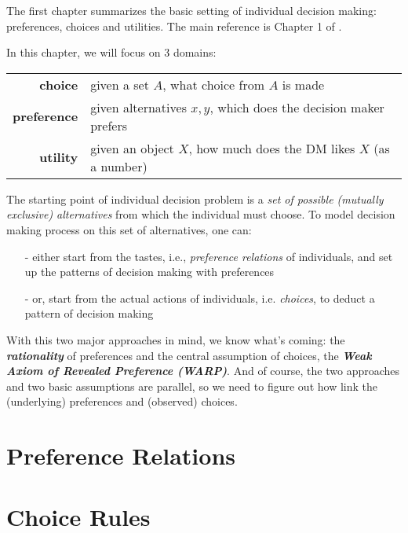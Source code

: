 \minitoc

\vspace{0.5cm}
The first chapter summarizes the basic setting of individual decision making: preferences, choices and utilities. The main reference is Chapter 1 of \citet{mas1995microeconomic}.

In this chapter, we will focus on 3 domains: 
\begin{center}
    \begin{tabular}{rl}
    \hline
    \textbf{choice} & given a set $A$, what choice from $A$ is made \\ 
    \textbf{preference} & given alternatives $x,y$, which does the decision maker prefers \\ 
    \textbf{utility} & given an object $X$, how much does the DM likes $X$ (as a number)\\
    \hline
    \end{tabular}
\end{center}

The starting point of individual decision problem is a \textit{set of possible (mutually exclusive) alternatives} from which the individual must choose. To model decision making process
on this set of alternatives, one can:
\begin{enumerate}
    \item[-] either start from the tastes, i.e., \textit{preference relations} of individuals, and set up the patterns of decision making with preferences
    \item[-] or, start from the actual actions of individuals, i.e. \textit{choices}, to deduct a pattern of decision making
\end{enumerate}

With this two major approaches in mind, we know what's coming: the \textit{\textbf{rationality}} of preferences and the central assumption of choices, the \textbf{\textit{Weak Axiom of Revealed Preference (WARP)}}.
And of course, the two approaches and two basic assumptions are parallel, so we need to figure out how link the (underlying) preferences and (observed) choices.

\section{Preference Relations}\label{chap1:sec1}


\section{Choice Rules}\label{chap1:sec2}


